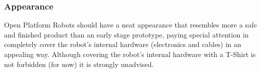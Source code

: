 \subsubsection{Appearance}
\label{rule:robots_appearance}
Open Platform Robots should have a neat appearance that resembles more a safe and finished product than an early stage prototype, paying special attention in completely cover the robot's internal hardware (electronics and cables) in an appealing way.
Although covering the robot's internal hardware with a T-Shirt is not forbidden (for now) it is strongly unadvised.